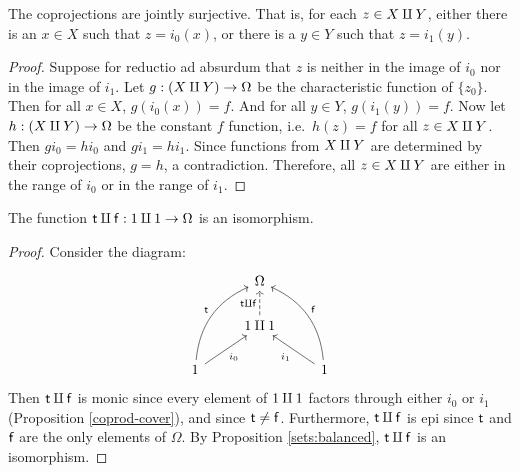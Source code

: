 

\begin{prop} The coprojections are jointly surjective.  That is, for
  each $z\in X\amalg Y$, either there is an $x\in X$ such that
  $z=i_0(x)$, or there is a $y\in Y$ such that
  $z=i_1(y)$. \label{coprod-cover} \end{prop}

\begin{proof} Suppose for reductio ad absurdum that $z$ is neither in
  the image of $i_0$ nor in the image of $i_1$.  Let $g:(X\amalg
  Y)\to\Omega$ be the characteristic function of $\{ z_0\}$. Then for
  all $x\in X$, $g(i_0(x))=f$.  And for all $y\in Y$, $g(i_1(y))=f$.
  Now let $h:(X\amalg Y)\to \Omega$ be the constant $f$ function, i.e.\
  $h(z)=f$ for all $z\in X\amalg Y$.  Then $gi_0=hi_0$ and $gi_1=hi_1$.
  Since functions from $X\amalg Y$ are determined by their
  coprojections, $g=h$, a contradiction.  Therefore, all $z\in X\amalg
  Y$ are either in the range of $i_0$ or in the range of $i_1$.
\end{proof}

\begin{prop} The function $\mathsf{t}\amalg \mathsf{f}:1\amalg 1\to \Omega$ is an
  isomorphism.  \label{set:boolean} \end{prop}

\begin{proof}  Consider the diagram:
  \[ \begin{tikzcd}
    & \Omega \\
    & 1 \cpr  1 \arrow[dashed,u,"\tr\amalg\f"] \\
    1 \arrow[bend left,uur,"\tr"] \arrow[ur,"i_0"'] & & 1 \arrow[bend
    right,uul,"\f"'] \arrow[ul,"i_1"] \end{tikzcd} \] Then
  $\mathsf{t}\amalg\mathsf{f}$ is monic since every element of $1\amalg 1$ factors
  through either $i_0$ or $i_1$ (Proposition \ref{coprod-cover}), and
  since $\mathsf{t}\neq \mathsf{f}$.  Furthermore, $\mathsf{t}\amalg\mathsf{f}$ is epi since $\mathsf{t}$
  and $\mathsf{f}$ are the only elements of $\Omega$.  By Proposition
  \ref{sets:balanced}, $\mathsf{t}\amalg\mathsf{f}$ is an isomorphism. \end{proof}

